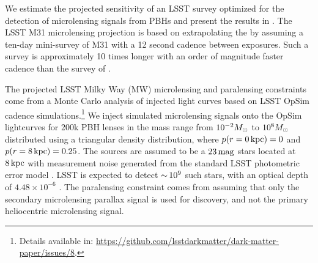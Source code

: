 
We estimate the projected sensitivity of an LSST survey optimized for the detection of microlensing signals from PBHs and present the results in .
The LSST M31 microlensing projection is based on extrapolating the \citet{1701.02151} by assuming a ten-day mini-survey of M31 with a 12 second cadence between exposures.
Such a survey is approximately 10 times longer with an order of magnitude faster cadence than the survey of \citet{1701.02151}.

The projected LSST Milky Way (MW) microlensing and paralensing constraints come from a Monte Carlo analysis of injected light curves based on LSST OpSim cadence simulations.\footnote{Details available in: \url{https://github.com/lsstdarkmatter/dark-matter-paper/issues/8}.}
We inject simulated microlensing signals onto the OpSim lightcurves for 200k PBH lenses in the mass range from $10^{-2}M_\odot$ to $10^{8}M_\odot$ distributed using a triangular density distribution, where $p(r = 0 \mathrm{\,kpc}) = 0$ and $p(r = 8\mathrm{\,kpc}) = 0.25$.
The sources are assumed to be a $23\mathrm{\,mag}$ stars located at $8\mathrm{\,kpc}$ with measurement noise generated from the standard LSST photometric error model \citep{0805.2366}.
LSST is expected to detect $ {\sim}\, 10^{9}$ such stars, with an optical depth of $4.48 \times 10^{-6}$ \citep{2006ApJ...636..240S}.
The paralensing constraint comes from assuming that only the secondary microlensing parallax signal is used for discovery, and not the primary heliocentric microlensing signal.

